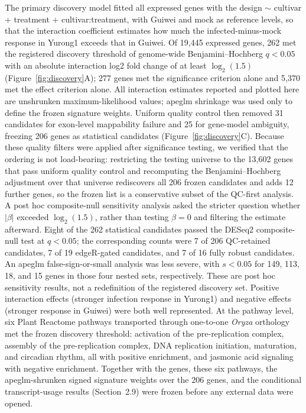 \documentclass[11pt]{article}
\newcommand{\q}{\textit{q}}
\begin{document}
The primary discovery model fitted all expressed genes with the design $\sim$ cultivar + treatment + cultivar:treatment, with Guiwei and mock as reference levels, so that the interaction coefficient estimates how much the infected-minus-mock response in Yurong1 exceeds that in Guiwei. Of 19,445 expressed genes, 262 met the registered discovery threshold of genome-wide Benjamini--Hochberg $\q<0.05$ with an absolute interaction log2 fold change of at least $\log_2(1.5)$ (Figure~\ref{fig:discovery}A); 277 genes met the significance criterion alone and 5,370 met the effect criterion alone. All interaction estimates reported and plotted here are unshrunken maximum-likelihood values; apeglm shrinkage was used only to define the frozen signature weights. Uniform quality control then removed 31 candidates for exon-level mappability failure and 25 for gene-model ambiguity, freezing 206 genes as statistical candidates (Figure~\ref{fig:discovery}C). Because these quality filters were applied after significance testing, we verified that the ordering is not load-bearing: restricting the testing universe to the 13,602 genes that pass uniform quality control and recomputing the Benjamini--Hochberg adjustment over that universe rediscovers all 206 frozen candidates and adds 12 further genes, so the frozen list is a conservative subset of the QC-first analysis. A post hoc composite-null sensitivity analysis asked the stricter question whether $|\beta|$ exceeded $\log_2(1.5)$, rather than testing $\beta=0$ and filtering the estimate afterward. Eight of the 262 statistical candidates passed the DESeq2 composite-null test at $\q<0.05$; the corresponding counts were 7 of 206 QC-retained candidates, 7 of 19 edgeR-gated candidates, and 7 of 16 fully robust candidates. An apeglm false-sign-or-small analysis was less severe, with $s<0.05$ for 149, 113, 18, and 15 genes in those four nested sets, respectively. These are post hoc sensitivity results, not a redefinition of the registered discovery set. Positive interaction effects (stronger infection response in Yurong1) and negative effects (stronger response in Guiwei) were both well represented. At the pathway level, six Plant Reactome pathways transported through one-to-one \textit{Oryza} orthology met the frozen discovery threshold: activation of the pre-replication complex, assembly of the pre-replication complex, DNA replication initiation, maturation, and circadian rhythm, all with positive enrichment, and jasmonic acid signaling with negative enrichment. Together with the genes, these six pathways, the apeglm-shrunken signed signature weights over the 206 genes, and the conditional transcript-usage results (Section~2.9) were frozen before any external data were opened.
\end{document}
